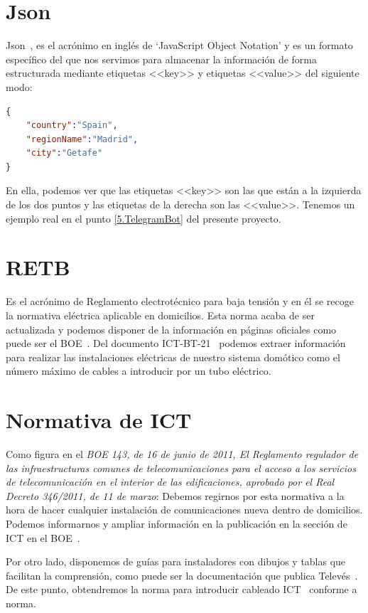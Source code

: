 \section{Json}\label{concepto:JSON}
{Json~\cite{misc:Json}}, es el acrónimo en inglés de ‘JavaScript Object Notation’ y es un formato específico del que nos servimos para almacenar la información de forma estructurada mediante etiquetas <<key>> y etiquetas <<value>> del siguiente modo:

\begin{lstlisting}[language=json,firstnumber=0,basicstyle=\small ]
{
    "country":"Spain", 
    "regionName":"Madrid", 
    "city":"Getafe"
}
\end{lstlisting}

En ella, podemos ver que las etiquetas <<key>> son las que están a la izquierda de los dos puntos y las etiquetas de la derecha son las <<value>>. Tenemos un ejemplo real en el punto \ref{5.TelegramBot} del presente proyecto.

\section{RETB}\label{concepto:RETB}
Es el acrónimo de Reglamento electrotécnico para baja tensión y en él se recoge la normativa eléctrica aplicable en domicilios.
Esta norma acaba de ser actualizada y podemos disponer de la información en páginas oficiales como puede ser el BOE~\cite{manual:REBT}.
Del documento ICT-BT-21~\cite{manual:ICT-BT-21} podemos extraer información para realizar las instalaciones eléctricas de nuestro sistema domótico como el número máximo de cables a introducir por un tubo eléctrico.

\section{Normativa de ICT}\label{concepto:Normativa_ICT}
Como figura en el \textit{BOE 143, de 16 de junio de 2011, El Reglamento regulador de las infraestructuras comunes de telecomunicaciones para el acceso a los servicios de telecomunicación en el interior de las edificaciones, aprobado por el Real Decreto 346/2011, de 11 de marzo}:
Debemos regirnos por esta normativa a la hora de hacer cualquier instalación de comunicaciones nueva dentro de domicilios.
Podemos informarnos y ampliar información en la publicación en la sección de ICT en el BOE~\cite{manual:ICT}.

Por otro lado, disponemos de guías para instaladores con dibujos y tablas que facilitan la comprensión, como puede ser la documentación que publica Televés~\cite{manual:ICT-Televes}. De este punto, obtendremos la norma para introducir cableado ICT~\cite{manual:ICT} conforme a norma.

